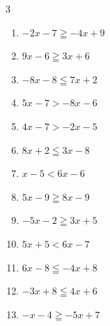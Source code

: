 \begin{multicols}{3}
\begin{enumerate}
        \phantom{$\displaystyle x>-1$}

  \item $-2x-7\geqq -4x+9$

        \phantom{$\displaystyle x\geqq 8$}

  \item $9x-6\geqq 3x+6$

        \phantom{$\displaystyle x\geqq 2$}

  \item $-8x-8\leqq 7x+2$


  \item $5x-7>-8x-6$


  \item $4x-7>-2x-5$


  \item $8x+2\leqq 3x-8$

        \phantom{$\displaystyle x\leqq -2$}

\columnbreak %

\resetques

  \item $x-5<6x-6$


  \item $5x-9\geqq 8x-9$

        \phantom{$\displaystyle x\leqq 0$}

  \item $-5x-2\geqq 3x+5$


  \item $5x+5<6x-7$

        \phantom{$\displaystyle x>12$}

  \item $6x-8\leqq -4x+8$


  \item $-3x+8\leqq 4x+6$


  \item $-x-4\geqq -5x+7$


\end{enumerate}
\end{multicols}
